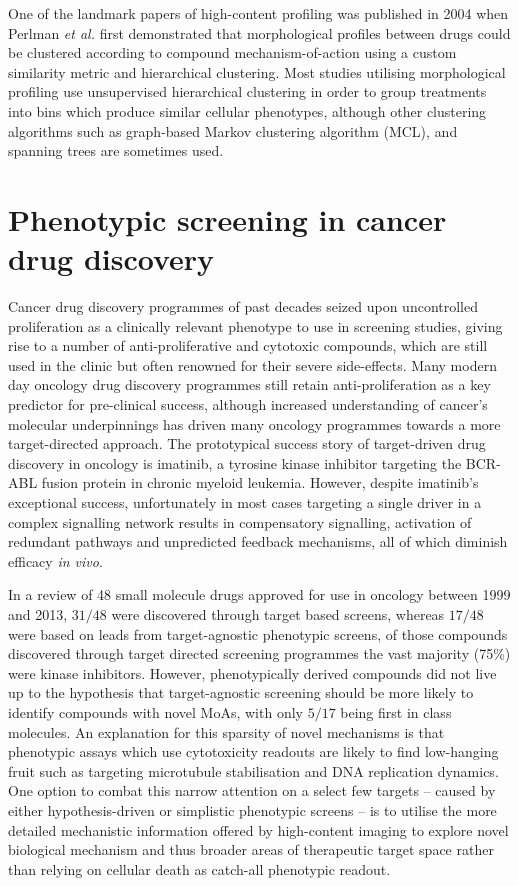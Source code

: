 \documentclass[a4paper,11pt,twoside,openright]{scrbook}
\begin{document}
One of the landmark papers of high-content profiling was published in 2004 when Perlman \textit{et al.} 
\cite{Perlman2004a} first demonstrated that morphological profiles between drugs could be clustered according to 
compound mechanism-of-action using a custom similarity metric and hierarchical clustering.
Most studies utilising morphological profiling use unsupervised hierarchical clustering in order to group treatments 
into bins which produce similar cellular phenotypes, \cite{Gustafsdottir2013,Young2008} although other clustering 
algorithms such as graph-based Markov clustering algorithm (MCL), \cite{Reisen2015,VanDongen2008} and spanning trees 
\cite{Qiu2011} are sometimes used.


\section{Phenotypic screening in cancer drug discovery}

Cancer drug discovery programmes of past decades seized upon uncontrolled proliferation as a clinically relevant 
phenotype to use in screening studies, giving rise to a number of anti-proliferative and cytotoxic compounds, which are 
still used in the clinic but often renowned for their severe side-effects.
Many modern day oncology drug discovery programmes still retain anti-proliferation as a key predictor for pre-clinical 
success, although increased understanding of cancer's molecular underpinnings has driven many oncology programmes 
towards a more target-directed approach.
The prototypical success story of target-driven drug discovery in oncology is imatinib, a tyrosine kinase inhibitor 
targeting the BCR-ABL fusion protein in chronic myeloid leukemia.
However, despite imatinib's exceptional success, unfortunately in most cases targeting a single driver in a complex 
signalling network results in compensatory signalling, activation of redundant pathways and unpredicted feedback 
mechanisms, all of which diminish efficacy \textit{in vivo}.

In a review of 48 small molecule drugs approved for use in oncology between 1999 and 2013, $31/48$ were discovered 
through target based screens, whereas $17/48$ were based on leads from target-agnostic phenotypic screens, 
\cite{Moffat2014} of those compounds discovered through target directed screening programmes the vast majority (75\%) 
were kinase inhibitors.
However, phenotypically derived compounds did not live up to the hypothesis that target-agnostic screening should be 
more likely to identify compounds with novel MoAs, \cite{Swinney2011} with only $5/17$ being first in class molecules.
An explanation for this sparsity of novel mechanisms is that phenotypic assays which use cytotoxicity readouts are 
likely to find low-hanging fruit such as targeting microtubule stabilisation and DNA replication dynamics. 
\cite{Moffat2014}
One option to combat this narrow attention on a select few targets -- caused by either hypothesis-driven or simplistic 
phenotypic screens -- is to utilise the more detailed mechanistic information offered by high-content imaging to 
explore novel biological mechanism and thus broader areas of therapeutic target space rather than relying on cellular 
death as catch-all phenotypic readout.
\end{document}
